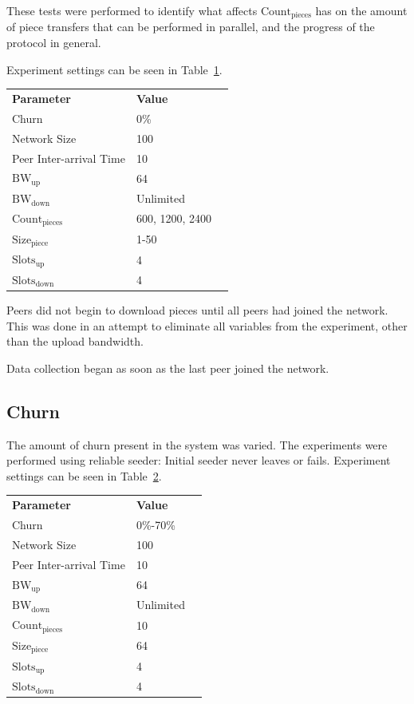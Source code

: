 \documentclass[a4paper,12pt,twocolumn]{article}
\newcommand{\tref}[1]{Table~\ref{#1}}
\begin{document}
These tests were performed to identify what affects $\text{Count}_{\text{pieces}}$ has on the amount of piece transfers that can be performed in parallel, and the progress of the protocol in general.

Experiment settings can be seen in \tref{tab:piece_count}.

\begin{table}[!htbp]
\centering
\footnotesize
\begin{tabular}{lll}
\textbf{Parameter} & \textbf{Value} \\
Churn & 0\% \\
Network Size & 100 \\
Peer Inter-arrival Time & 10 \\
$\text{BW}_{\text{up}}$ & 64 \\
$\text{BW}_{\text{down}}$ & Unlimited \\
$\text{Count}_{\text{pieces}}$ & 600, 1200, 2400 \\
$\text{Size}_{\text{piece}}$ & 1-50 \\
$\text{Slots}_{\text{up}}$ & 4 \\
$\text{Slots}_{\text{down}}$ & 4 \\
\end{tabular}
\label{tab:piece_count}
\end{table}

Peers did not begin to download pieces until all peers had joined the network. 
This was done in an attempt to eliminate all variables from the experiment, other than the upload bandwidth.

Data collection began as soon as the last peer joined the network.

\subsection{Churn}
\label{subsec:churn}
The amount of churn present in the system was varied.  The experiments were performed using reliable seeder: Initial seeder never leaves or fails. Experiment settings can be seen in \tref{tab:churn}.

\begin{table}[!htbp]
\centering
\footnotesize
\begin{tabular}{lll}
\textbf{Parameter} & \textbf{Value} \\
Churn & 0\%-70\% \\
Network Size & 100 \\
Peer Inter-arrival Time & 10 \\
$\text{BW}_{\text{up}}$ & 64 \\
$\text{BW}_{\text{down}}$ & Unlimited \\
$\text{Count}_{\text{pieces}}$ & 10 \\
$\text{Size}_{\text{piece}}$ & 64 \\
$\text{Slots}_{\text{up}}$ & 4 \\
$\text{Slots}_{\text{down}}$ & 4 \\
\end{tabular}
\label{tab:churn}
\end{table}
\end{document}
